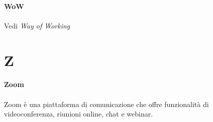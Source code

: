 \documentclass[10pt, a4paper]{article}
\begin{document}
\vspace{2em}
\paragraph{WoW}\noindent\hrulefill
\paragraph{}Vedi \textit{Way of Working\pg}

\newpage
\section{Z}
\vspace{2em}
\paragraph{Zoom}\noindent\hrulefill
\paragraph{}Zoom è una piattaforma di comunicazione che offre funzionalità di videoconferenza, riunioni online, chat e webinar.
\end{document}

